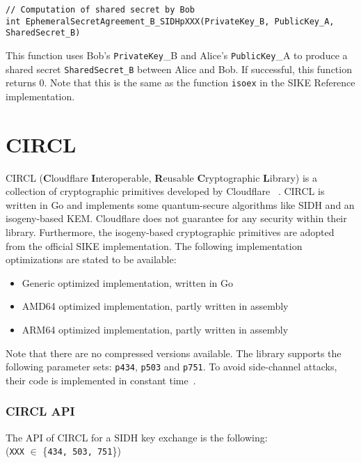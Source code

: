 \begin{lstlisting}[]
// Computation of shared secret by Bob
int EphemeralSecretAgreement_B_SIDHpXXX(PrivateKey_B, PublicKey_A, SharedSecret_B)
\end{lstlisting}
This function uses Bob's \textcolor{keywordcol}{\texttt{PrivateKey}\_B} and Alice's \textcolor{keywordcol}{\texttt{PublicKey}\_A} to produce a shared secret \textcolor{keywordcol}{\texttt{SharedSecret\_B}} between Alice and Bob. If successful, this function returns 0. 
Note that this is the same as the function \texttt{isoex} in the SIKE Reference implementation.



\section{\gls{CIRCL}}

\gls{CIRCL} (\textbf{C}loudflare \textbf{I}nteroperable, \textbf{R}eusable \textbf{C}ryptographic \textbf{L}ibrary) is a collection of cryptographic primitives developed by Cloudflare ~\parencite{circl2020github}. \gls{CIRCL} is written in Go and implements some quantum-secure algorithms like \gls{SIDH} and an isogeny-based \gls{KEM}. Cloudflare does not guarantee for any security within their library. Furthermore, the isogeny-based cryptographic primitives are adopted from the official \gls{SIKE} implementation. The following implementation optimizations are stated to be available:

\begin{itemize}
  \item Generic optimized implementation, written in Go 
  \item AMD64 optimized implementation, partly written in assembly
  \item ARM64 optimized implementation, partly written in assembly
\end{itemize}
Note that there are no compressed versions available. The library supports the following parameter sets: \texttt{p434}, \texttt{p503} and \texttt{p751}. To avoid side-channel attacks, their code is implemented in constant time~\parencite{circl2019intro}.

\subsubsection{\gls{CIRCL} API}
The API of \gls{CIRCL} for a \gls{SIDH} key exchange is the following:\\
(\texttt{XXX} $\in$ \{\texttt{434, 503, 751}\})


